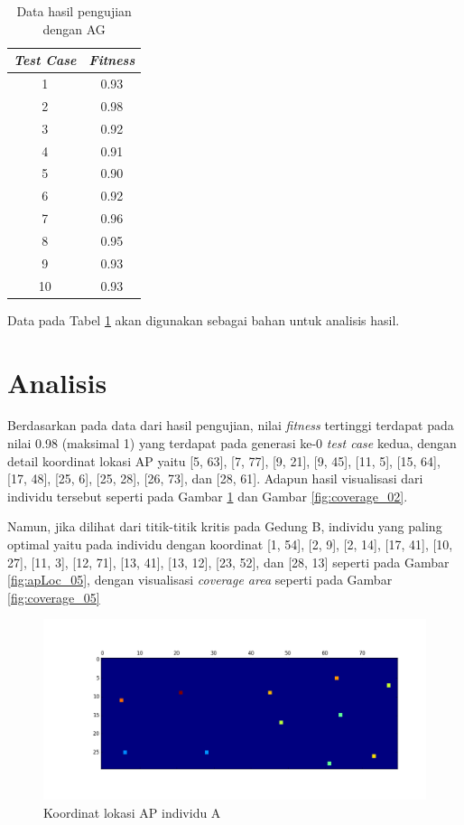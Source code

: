 \documentclass[12pt,a4paper]{report}
\begin{document}
		\begin{table}
			\centering
			\begin{tabular}{|c|c|}
				\hline \textbf{\emph{Test Case}} & \textbf{\emph{Fitness}} \\ 
				\hline 1 & 0.93 \\ 
				\hline 2 & 0.98 \\ 
				\hline 3 & 0.92 \\ 
				\hline 4 & 0.91 \\ 
				\hline 5 & 0.90 \\ 
				\hline 6 & 0.92 \\ 
				\hline 7 & 0.96 \\ 
				\hline 8 & 0.95 \\ 
				\hline 9 & 0.93 \\ 
				\hline 10 & 0.93 \\ 
				\hline 
			\end{tabular}
			\caption{Data hasil pengujian dengan AG}
			\label{tab:1}
		\end{table}
		Data pada Tabel \ref{tab:1} akan digunakan sebagai bahan untuk analisis hasil.
		\section{Analisis}
		Berdasarkan pada data dari hasil pengujian, nilai \emph{fitness} tertinggi terdapat pada nilai 0.98 (maksimal 1) yang terdapat pada generasi ke-0 \emph{test case} kedua, dengan detail koordinat lokasi AP yaitu [5, 63], [7, 77], [9, 21], [9, 45], [11, 5], [15, 64], [17, 48], [25, 6], [25, 28], [26, 73], dan [28, 61]. Adapun hasil visualisasi dari individu tersebut seperti pada Gambar \ref{fig:apLoc_02} dan Gambar \ref{fig:coverage_02}.
		
		Namun, jika dilihat dari titik-titik kritis pada Gedung B, individu yang paling optimal yaitu pada individu dengan koordinat [1, 54], [2, 9], [2, 14], [17, 41], [10, 27], [11, 3], [12, 71], [13, 41], [13, 12], [23, 52], dan [28, 13] seperti pada Gambar \ref{fig:apLoc_05}, dengan visualisasi \emph{coverage area} seperti pada Gambar \ref{fig:coverage_05}
		
		\begin{figure}[h]
			\centering
			\includegraphics[width=0.5\linewidth]{apLoc_02}
			\caption{Koordinat lokasi AP individu A}
			\label{fig:apLoc_02}
		\end{figure}	
		
\end{document}
